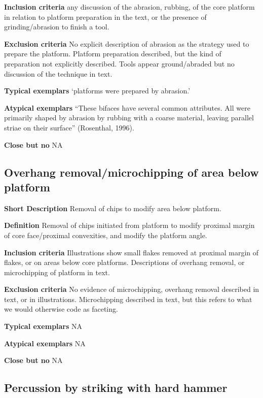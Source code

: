 \documentclass[
]{article}
\begin{document}
\textbf{Inclusion criteria} any discussion of the abrasion, rubbing, of
the core platform in relation to platform preparation in the text, or
the presence of grinding/abrasion to finish a tool.

\textbf{Exclusion criteria} No explicit description of abrasion as the
strategy used to prepare the platform. Platform preparation described,
but the kind of preparation not explicitly described. Tools appear
ground/abraded but no discussion of the technique in text.

\textbf{Typical exemplars} `platforms were prepared by abrasion.'

\textbf{Atypical exemplars} ``These bifaces have several common
attributes. All were primarily shaped by abrasion by rubbing with a
coarse material, leaving parallel striae on their surface'' (Rosenthal,
1996).

\textbf{Close but no} NA

\hypertarget{overhang-removalmicrochipping-of-area-below-platform}{%
\subsection{Overhang removal/microchipping of area below
platform}\label{overhang-removalmicrochipping-of-area-below-platform}}

\textbf{Short Description} Removal of chips to modify area below
platform.

\textbf{Definition} Removal of chips initiated from platform to modify
proximal margin of core face/proximal convexities, and modify the
platform angle.

\textbf{Inclusion criteria} Illustrations show small flakes removed at
proximal margin of flakes, or on areas below core platforms.
Descriptions of overhang removal, or microchipping of platform in text.

\textbf{Exclusion criteria} No evidence of microchipping, overhang
removal described in text, or in illustrations. Microchipping described
in text, but this refers to what we would otherwise code as faceting.

\textbf{Typical exemplars} NA

\textbf{Atypical exemplars} NA

\textbf{Close but no} NA

\hypertarget{percussion-by-striking-with-hard-hammer}{%
\subsection{Percussion by striking with hard
hammer}\label{percussion-by-striking-with-hard-hammer}}
\end{document}
